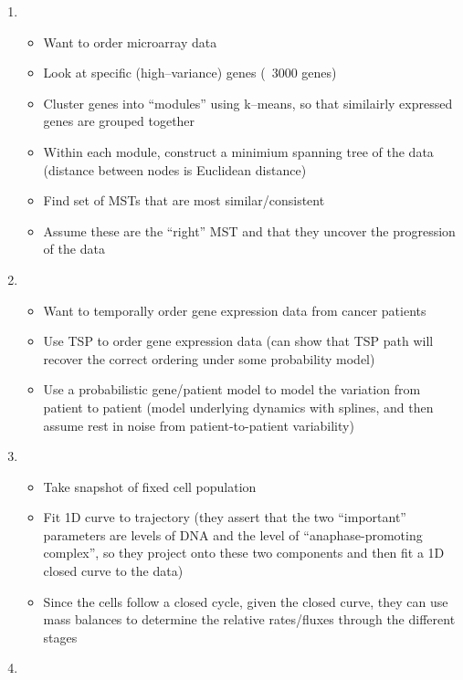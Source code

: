 \documentclass[12pt]{article}
\begin{document}
\begin{enumerate}
\item {}
\begin{itemize}
	\item Want to order microarray data
	\item Look at specific (high--variance) genes (~3000 genes)
	\item Cluster genes into ``modules'' using k--means, so that similairly expressed genes are grouped together
	\item Within each module, construct a minimium spanning tree of the data (distance between nodes is Euclidean distance)
	\item Find set of MSTs that are most similar/consistent
	\item Assume these are the ``right'' MST and that they uncover the progression of the data
\end{itemize}

\item {}
\begin{itemize}
	\item Want to temporally order gene expression data from cancer patients
	\item Use TSP to order gene expression data (can show that TSP path will recover the correct ordering under some probability model)
	\item Use a probabilistic gene/patient model to model the variation from patient to patient (model underlying dynamics with splines, and then assume rest in noise from patient-to-patient variability)
\end{itemize}

\item {}
\begin{itemize}
	\item Take snapshot of fixed cell population
	\item Fit 1D curve to trajectory (they assert that the two ``important'' parameters are levels of DNA and the level of ``anaphase-promoting complex'', so they project onto these two components and then fit a 1D closed curve to the data)
	\item Since the cells follow a closed cycle, given the closed curve, they can use mass balances to determine the relative rates/fluxes through the different stages
\end{itemize}

\item {}


\end{enumerate}
\end{document}
